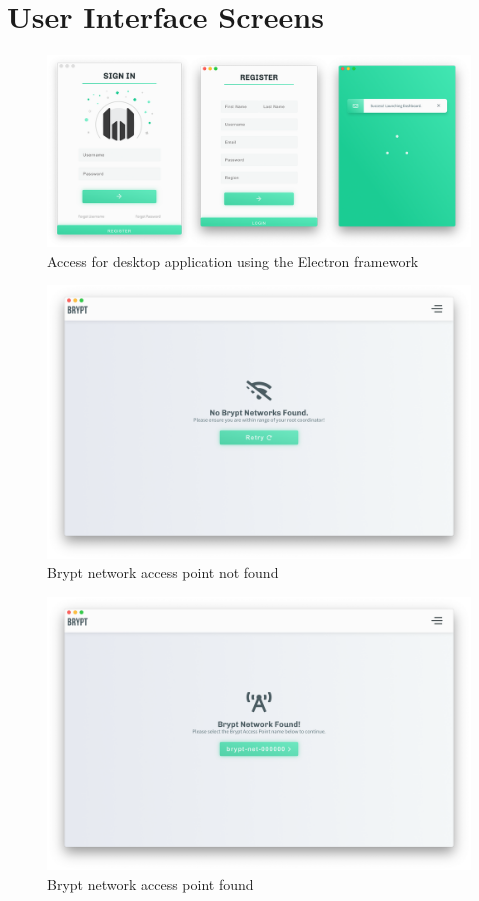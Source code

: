 \documentclass[tikz,a4paper,titlepage]{article}
\begin{document}
\section{User Interface Screens}

\begin{figure}[H]
  \centering
    \includegraphics[scale=1.6]{access-window.png}
    \caption{Access for desktop application using the Electron framework}
\end{figure}

\begin{figure}[H]
  \centering
    \includegraphics[scale=0.35]{access-point-not-found.png}
    \caption{Brypt network access point not found}
\end{figure}

\begin{figure}[H]
  \centering
    \includegraphics[scale=0.35]{access-point-found.png}
    \caption{Brypt network access point found}
\end{figure}
\end{document}

